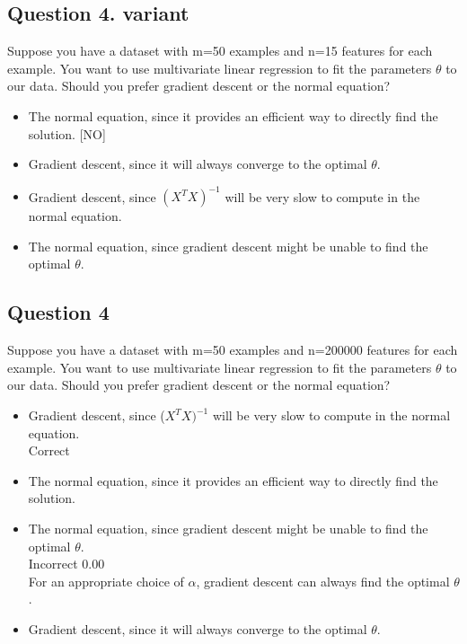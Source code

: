 \documentclass[11pt]{article} %
\begin{document}
	\subsection{Question 4. variant} 
		Suppose you have a dataset with m=50 examples and n=15 features for each example. You want to use multivariate linear regression to fit the  parameters $\theta$ to our data. Should you prefer gradient descent or the normal equation?
		
	\begin{itemize}
		\item The normal equation, since it provides an efficient way to directly find the solution. [NO]
		
		\item Gradient descent, since it will always converge to the optimal $\theta$.
		
		\item Gradient descent, since $(X^TX)^{-1}$ will be very slow to compute in the normal equation.
		
		\item The normal equation, since gradient descent might be unable to find the optimal $\theta$.
	\end{itemize}
	
	\subsection*{Question 4}
	Suppose you have a dataset with m=50 examples and n=200000 features for each example. 
	You want to use multivariate linear regression to fit the parameters $\theta$ to our data. 
	Should you prefer gradient descent or the normal equation?
	
	\begin{itemize}
		\item Gradient descent, since ($X^TX)^{-1}$ will be very slow to compute in the normal equation.	
		\\ Correct
		
		\item The normal equation, since it provides an efficient way to directly find the solution.			
		\item The normal equation, since gradient descent might be unable to find the optimal $\theta$.	
		\\Incorrect	0.00	 \\ For an appropriate choice of $\alpha$, gradient descent can always find the optimal $\theta$.
		\item Gradient descent, since it will always converge to the optimal $\theta$.			
	\end{itemize}	
\end{document}
